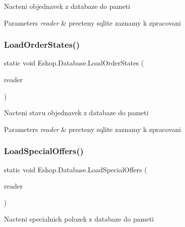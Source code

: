 Nacteni objednavek z databaze do pameti 


\begin{DoxyParams}{Parameters}
{\em reader} & precteny sqlite zaznamy k zpracovani\\
\hline
\end{DoxyParams}
\mbox{\label{class_eshop_1_1_database_aa12ddf3915d8952fb6f5e4c87b272444}} 
\subsubsection{\texorpdfstring{LoadOrderStates()}{LoadOrderStates()}}
{\footnotesize\ttfamily static void Eshop.\+Database.\+Load\+Order\+States (\begin{DoxyParamCaption}\item[{S\+Q\+Lite\+Data\+Reader}]{reader }\end{DoxyParamCaption})\hspace{0.3cm}{\ttfamily [static]}}



Nacteni stavu objednavek z databaze do pameti 


\begin{DoxyParams}{Parameters}
{\em reader} & precteny sqlite zaznamy k zpracovani\\
\hline
\end{DoxyParams}
\mbox{\label{class_eshop_1_1_database_a329b6c5162884bb8eaa7407c0a0526f3}} 
\subsubsection{\texorpdfstring{LoadSpecialOffers()}{LoadSpecialOffers()}}
{\footnotesize\ttfamily static void Eshop.\+Database.\+Load\+Special\+Offers (\begin{DoxyParamCaption}\item[{S\+Q\+Lite\+Data\+Reader}]{reader }\end{DoxyParamCaption})\hspace{0.3cm}{\ttfamily [static]}}



Nacteni specialnich polozek z databaze do pameti 


